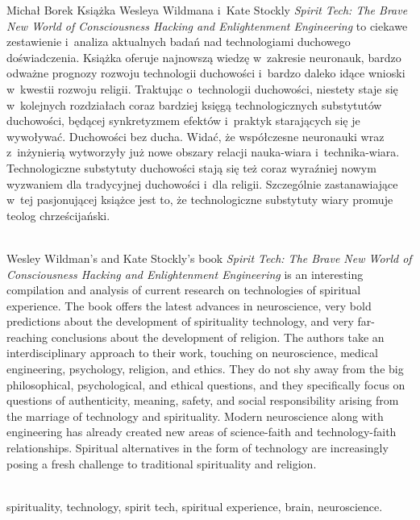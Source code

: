 \begin{newrevplenv}{Michał Borek}
Książka Wesleya Wildmana i~Kate Stockly \textit{Spirit Tech: The Brave New World of Consciousness Hacking and Enlightenment Engineering} to ciekawe zestawienie i~analiza aktualnych badań nad technologiami duchowego doświadczenia. Książka oferuje najnowszą wiedzę w~zakresie neuronauk, bardzo odważne prognozy rozwoju technologii duchowości i~bardzo daleko idące wnioski w~kwestii rozwoju religii. Traktując o~technologii duchowości, niestety staje się w~kolejnych rozdziałach coraz bardziej księgą technologicznych substytutów duchowości, będącej synkretyzmem efektów i~praktyk starających się je wywoływać. Duchowości bez ducha. Widać, że współczesne neuronauki wraz z~inżynierią wytworzyły już nowe obszary relacji nauka-wiara i~technika-wiara. Technologiczne substytuty duchowości stają się też coraz wyraźniej nowym wyzwaniem dla tradycyjnej duchowości i~dla religii. Szczególnie zastanawiające w~tej pasjonującej książce jest to, że technologiczne substytuty wiary promuje teolog chrześcijański.







\vspace{5mm}%
\begin{flushright}
{\chaptitleeng\color{black!50}{Spirituality without spirit}}
\end{flushright}

{}\\
{Wesley Wildman's and Kate Stockly's book \textit{Spirit Tech: The Brave New World of Consciousness Hacking and Enlightenment Engineering} is an interesting compilation and analysis of current research on technologies of spiritual experience. The book offers the latest advances in neuroscience, very bold predictions about the development of spirituality technology, and very far-reaching conclusions about the development of religion. The authors take an interdisciplinary approach to their work, touching on neuroscience, medical engineering, psychology, religion, and ethics. They do not shy away from the big philosophical, psychological, and ethical questions, and they specifically focus on questions of authenticity, meaning, safety, and social responsibility arising from the marriage of technology and spirituality. Modern neuroscience along with engineering has already created new areas of science-faith and technology-faith relationships. Spiritual alternatives in the form of technology are increasingly posing a fresh challenge to traditional spirituality and religion.}\par%
\vspace{2mm}%
{}\\%
{spirituality, technology, spirit tech, spiritual experience, brain, neuroscience.}%





\end{newrevplenv}